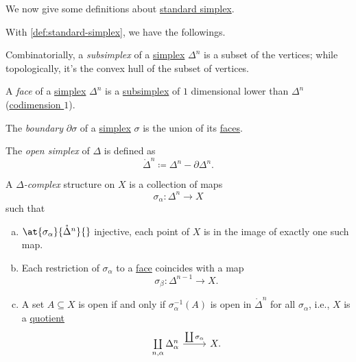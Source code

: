 We now give some definitions about \hyperref[def:standard-simplex]{standard simplex}.

\begin{definition*}
	With \autoref{def:standard-simplex}, we have the followings.
	\begin{definition}[Subsimplex]\label{def:subsimplex}
		Combinatorially, a \emph{subsimplex} of a \hyperref[def:standard-simplex]{simplex} \(\Delta^n\) is a subset of the vertices; while topologically, it's the convex hull of the subset of vertices.
		\begin{figure}[H]
			\centering
			\label{fig:def:subsimplex}
		\end{figure}
	\end{definition}

	\begin{definition}[Face]\label{def:face}
		A \emph{face} of a \hyperref[def:standard-simplex]{simplex} \(\Delta ^n\) is a \hyperref[def:subsimplex]{subsimplex} of \(1\) dimensional lower
		than \(\Delta ^n\) (\underline{codimension \(1\)}).
	\end{definition}

	\begin{definition}[Boundary]\label{def:boundary}
		The \emph{boundary} \(\partial \sigma \) of a \hyperref[def:standard-simplex]{simplex} \(\sigma \) is the union of its \hyperref[def:face]{faces}.
	\end{definition}

	\begin{definition}\label{def:open-simplex}
		The \emph{open simplex} of \(\Delta \) is defined as
		\[
			\mathring{\Delta}^n \coloneqq \Delta^n - \partial \Delta^n.
		\]
	\end{definition}
\end{definition*}

\begin{definition}\label{def:delta-complex}
	A \emph{\(\Delta \)-complex} structure on \(X\) is a collection of maps
	\[
		\sigma _\alpha \colon \Delta ^n\to X
	\]
	such that
	\begin{enumerate}[(a)]
		\item \(\at{\sigma _\alpha }{\mathring{\Delta}^n}{}\) injective, each point of \(X\) is in the image of exactly one such map.
		\item Each restriction of \(\sigma _\alpha \) to a \hyperref[def:face]{face} coincides with a map
		      \[
			      \sigma _\beta \colon \Delta^{n-1} \to X.
		      \]
		\item A set \(A\subseteq X\) is open if and only if \(\sigma ^{-1} _\alpha (A)\) is open in \(\mathring{\Delta }^n\) for all \(\sigma _\alpha \), i.e., \(X\) is a \hyperref[CW-complex-quotient]{quotient}
		      \[
			      \begin{tikzcd}
				      {\coprod\limits_{n, \alpha }\Delta ^n_\alpha} & {X.}
				      \arrow["{\coprod \sigma _\alpha}", from=1-1, to=1-2]
			      \end{tikzcd}
		      \]
	\end{enumerate}
\end{definition}

